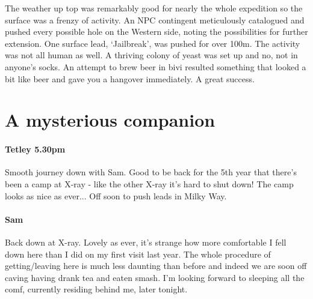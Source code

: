 The weather up top was remarkably good for nearly the whole expedition so the surface was a frenzy of activity. An NPC contingent meticulously catalogued and pushed every possible hole on the Western side, noting the possibilities for further extension. One surface lead, ‘Jailbreak’, was pushed for over 100m. The activity was not all human as well. A thriving colony of yeast was set up and no, not in anyone’s socks. An attempt to brew beer in bivi resulted something that looked a bit like beer and gave you a hangover immediately. A great success.

\newpage

\begin{marginfigure}
\end{marginfigure}

\section{A mysterious companion}

\paragraph{Tetley 5.30pm}
Smooth journey down with Sam. Good to be back for the 5th year that there’s been a camp at X-ray - like the other X-ray it’s hard to shut down! The camp looks as nice as ever... Off soon to push leads in Milky Way.

\paragraph{Sam}
Back down at X-ray. Lovely as ever, it’s strange how more comfortable I fell down here than I did on my first visit last year. The whole procedure of getting/leaving here is much less daunting than before and indeed we are soon off caving having drank tea and eaten smash. I’m looking forward to sleeping all the comf, currently residing behind me, later tonight.


